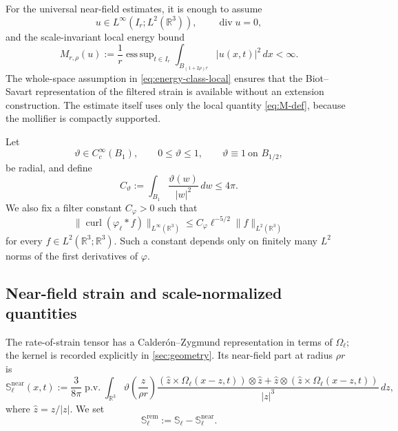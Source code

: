 \documentclass[11pt]{article}
\numberwithin{equation}{section}
\theoremstyle{plain}
\theoremstyle{definition}
\theoremstyle{remark}
\DeclareMathOperator*{\esssup}{ess\,sup}
\DeclareMathOperator{\curl}{curl}
\DeclareMathOperator{\diver}{div}
\newcommand{\R}{\mathbb R}
\newcommand{\pv}{\operatorname{p.v.}}
\begin{document}
For the universal near-field estimates, it is enough to assume
\begin{equation}\label{eq:energy-class-local}
u\in L^\infty(I_r;L^2(\R^3)),
\qquad
\diver u=0,
\end{equation}
and the scale-invariant local energy bound
\begin{equation}\label{eq:M-def}
M_{r,\rho}(u)
:=\frac1r\esssup_{t\in I_r}
\int_{B_{(1+2\rho)r}}|u(x,t)|^2\,dx
<\infty.
\end{equation}
The whole-space assumption in \eqref{eq:energy-class-local} ensures that the Biot--Savart representation of the filtered strain is available without an extension construction. The estimate itself uses only the local quantity \eqref{eq:M-def}, because the mollifier is compactly supported.

Let
\begin{equation}\label{eq:theta}
\vartheta\in C_c^\infty(B_1),
\qquad
0\le\vartheta\le1,
\qquad
\vartheta\equiv1\ \text{on }B_{1/2},
\end{equation}
be radial, and define
\begin{equation}\label{eq:Ctheta}
C_\vartheta
:=\int_{B_1}\frac{\vartheta(w)}{|w|^2}\,dw
\le 4\pi.
\end{equation}
We also fix a filter constant $C_\varphi>0$ such that
\begin{equation}\label{eq:Cphi-def}
\|\curl(\varphi_\ell*f)\|_{L^\infty(\R^3)}
\le C_\varphi\ell^{-5/2}\|f\|_{L^2(\R^3)}
\end{equation}
for every $f\in L^2(\R^3;\R^3)$. Such a constant depends only on finitely many $L^2$ norms of the first derivatives of $\varphi$.

\subsection{Near-field strain and scale-normalized quantities}

The rate-of-strain tensor has a Calder\'on--Zygmund representation in terms of $\Omega_\ell$; the kernel is recorded explicitly in \cref{sec:geometry}. Its near-field part at radius $\rho r$ is
\begin{equation}\label{eq:S-near-def}
\mathbb S_\ell^{\mathrm{near}}(x,t)
:=
\frac{3}{8\pi}\pv\int_{\R^3}
\vartheta\!\left(\frac z{\rho r}\right)
\frac{
(\widehat z\times\Omega_\ell(x-z,t))\otimes\widehat z
+
\widehat z\otimes(\widehat z\times\Omega_\ell(x-z,t))
}{|z|^3}\,dz,
\end{equation}
where $\widehat z=z/|z|$. We set
\begin{equation}\label{eq:S-rem-def}
\mathbb S_\ell^{\mathrm{rem}}
:=\mathbb S_\ell-\mathbb S_\ell^{\mathrm{near}}.
\end{equation}
\end{document}
